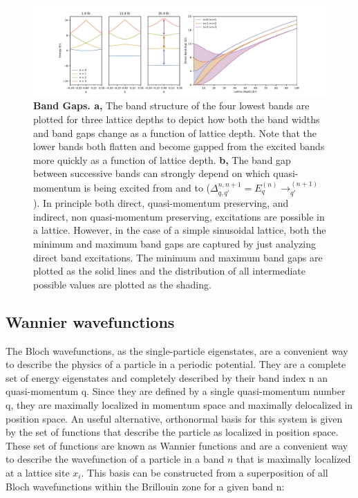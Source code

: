 \begin{figure}[h!]
		\includegraphics[width=\columnwidth]{figures/ch1/BandStructure/BSScale.pdf} 
		\caption{\textbf{Band Gaps. a,} The band structure of the four lowest bands are plotted for three lattice depths to depict how both the band widths and band gaps change as a function of lattice depth. Note that the lower bands both flatten and become gapped from the excited bands more quickly as a function of lattice depth. \textbf{b,} The band gap between successive bands can strongly depend on which quasi-momentum is being excited from and to ($\Delta_{q,q'}^{n,n+1}=E_q^{(n)}\rightarrow_{q'}^{(n+1)}$). In principle both direct, quasi-momentum preserving, and indirect, non quasi-momentum preserving, excitations are possible in a lattice. However, in the case of a simple sinusoidal lattice, both the minimum and maximum band gaps are captured by just analyzing direct band excitations. The minimum and maximum band gaps are plotted as the solid lines and the distribution of all intermediate possible values are plotted as the shading.}
		\label{fig:bandGaps}	
\end{figure}

\subsection{Wannier wavefunctions}

The Bloch wavefunctions, as the single-particle eigenstates, are a convenient way to describe the physics of a particle in a periodic potential. They are a complete set of energy eigenstates and completely described by their band index n an quasi-momentum q. Since they are defined by a single quasi-momentum number q, they are maximally localized in momentum space and maximally delocalized in position space. An useful alternative, orthonormal basis for this system is given by the set of functions that describe the particle as localized in position space. These set of functions are known as Wannier functions and are a convenient way to describe the wavefunction of a particle in a band $n$ that is maximally localized at a lattice site $x_i$. This basis can be constructed from a superposition of all Bloch wavefunctions   within the Brillouin zone for a given band n:


